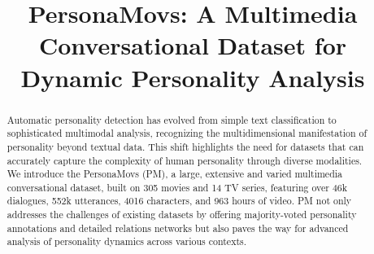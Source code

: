 \documentclass[11pt]{article}
\title{PersonaMovs: A Multimedia Conversational Dataset for Dynamic Personality Analysis}
\begin{document}
\maketitle
\begin{abstract}
Automatic personality detection has evolved from simple text classification to sophisticated multimodal analysis, recognizing the multidimensional manifestation of personality beyond textual data. This shift highlights the need for datasets that can accurately capture the complexity of human personality through diverse modalities. We introduce the PersonaMovs (PM), a large, extensive and varied multimedia conversational dataset, built on 305 movies and 14 TV series, featuring over 46k dialogues, 552k utterances, 4016 characters, and 963 hours of video. PM not only addresses the challenges of existing datasets by offering majority-voted personality annotations and detailed relations networks but also paves the way for advanced analysis of personality dynamics across various contexts.
\end{abstract}











\end{document}
